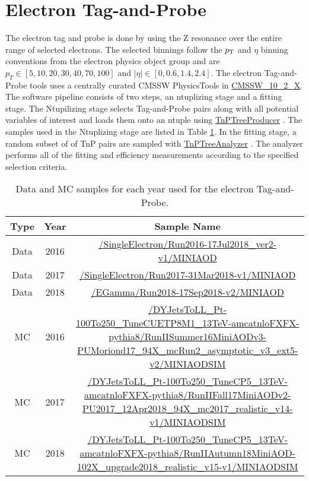 

\FloatBarrier
\section{Electron Tag-and-Probe }

The electron tag and probe is done by using the Z resonance over the entire \pt range of selected electrons. The selected binnings follow the $p_{\mathrm{T}}$ and $\eta$ binning conventions from the electron physics object group and are $ p_T \in [5, 10, 20, 30, 40, 70, 100]$ and $|\eta| \in [ 0, 0.6, 1.4, 2.4]$. The electron Tag-and-Probe tools uses a centrally curated CMSSW PhysicsTools in \url{CMSSW_10_2_X}. The software pipeline consists of two steps, an ntuplizing stage and a fitting stage. The  Ntupilizing stage selects Tag-and-Probe pairs along with all potential variables of interest and loads them onto an ntuple using \url{TnPTreeProducer} \cite{ElTnPGit}. The samples used in the Ntuplizing stage are listed in Table \ref{tab:electronTnPSamples}. In the fitting stage, a random subset of of TnP pairs are sampled with \url{TnPTreeAnalyzer} \cite{ElTnPAnaGit}. The analyzer performs all of the fitting and efficiency measurements according to the specified selection criteria. 

\begin{table}
\caption{ Data and MC samples for each year used for the electron Tag-and-Probe. }
\label{tab:electronTnPSamples}
\scriptsize
\begin{tabular}{|c|c|c|}
\hline 
Type & Year & Sample Name \\ 
\hline 
Data & 2016 & \tiny \url{/SingleElectron/Run2016-17Jul2018_ver2-v1/MINIAOD}  \\  
Data & 2017 & \tiny \url{/SingleElectron/Run2017-31Mar2018-v1/MINIAOD} \\  
Data & 2018 & \tiny \url{/EGamma/Run2018-17Sep2018-v2/MINIAOD} \\ 
\hline 
MC & 2016 & \tiny \url{/DYJetsToLL_Pt-100To250_TuneCUETP8M1_13TeV-amcatnloFXFX-pythia8/RunIISummer16MiniAODv3-PUMoriond17_94X_mcRun2_asymptotic_v3_ext5-v2/MINIAODSIM} \\ 
MC & 2017 & \tiny \url{/DYJetsToLL_Pt-100To250_TuneCP5_13TeV-amcatnloFXFX-pythia8/RunIIFall17MiniAODv2-PU2017_12Apr2018_94X_mc2017_realistic_v14-v1/MINIAODSIM} \\ 
MC & 2018 & \tiny \url{/DYJetsToLL_Pt-100To250_TuneCP5_13TeV-amcatnloFXFX-pythia8/RunIIAutumn18MiniAOD-102X_upgrade2018_realistic_v15-v1/MINIAODSIM} \\ 
\hline
\end{tabular} 
\end{table}




